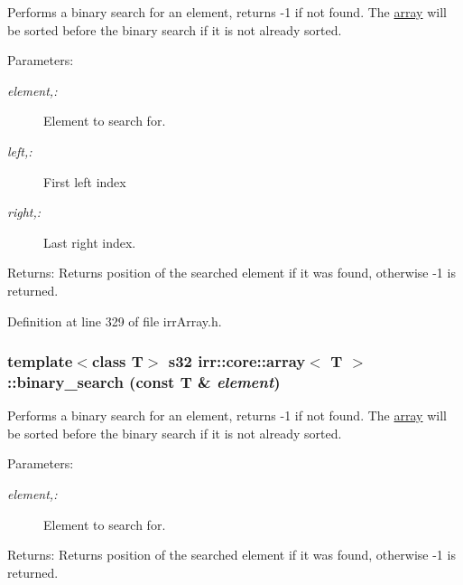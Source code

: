 Performs a binary search for an element, returns -1 if not found. The \hyperlink{classirr_1_1core_1_1array}{array} will be sorted before the binary search if it is not already sorted. \begin{Desc}
\item[Parameters:]
\begin{description}
\item[{\em element,:}]Element to search for. \item[{\em left,:}]First left index \item[{\em right,:}]Last right index. \end{description}
\end{Desc}
\begin{Desc}
\item[Returns:]Returns position of the searched element if it was found, otherwise -1 is returned. \end{Desc}


Definition at line 329 of file irrArray.h.\hypertarget{classirr_1_1core_1_1array_225b3bcb55293f18b90e069a979e44c6}{
\subsubsection[{binary\_\-search}]{\setlength{\rightskip}{0pt plus 5cm}template$<$class T$>$ {\bf s32} {\bf irr::core::array}$<$ T $>$::binary\_\-search (const T \& {\em element})}}
\label{classirr_1_1core_1_1array_225b3bcb55293f18b90e069a979e44c6}


Performs a binary search for an element, returns -1 if not found. The \hyperlink{classirr_1_1core_1_1array}{array} will be sorted before the binary search if it is not already sorted. \begin{Desc}
\item[Parameters:]
\begin{description}
\item[{\em element,:}]Element to search for. \end{description}
\end{Desc}
\begin{Desc}
\item[Returns:]Returns position of the searched element if it was found, otherwise -1 is returned. \end{Desc}


